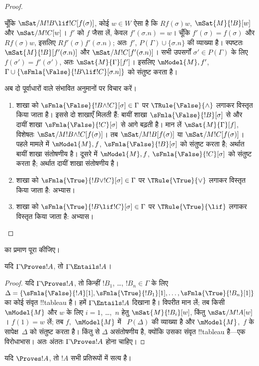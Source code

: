 \documentclass[../../../include/open-logic-section]{subfiles}
\begin{document}
\begin{proof}
\begin{enumerate}
  चूँकि $\mSat/{M}{!B \lif !C}[f(\sigma)]$, कोई $w \in W$ ऐसा है कि
  $Rf(\sigma)w$, $\mSat{M}{!B}[w]$ और $\mSat/{M}{!C}[w]$। $f'$ को $f$
  जैसा लें, केवल $f'(\sigma.n) = w$। चूँकि $f'(\sigma) = f(\sigma)$ और
  $Rf(\sigma)w$, इसलिए $Rf'(\sigma)f'(\sigma.n)$; अतः $f'$,
  $P(\Gamma) \cup \{\sigma.n\}$ की व्याख्या है। स्पष्टतः
  $\mSat{M}{!B}[f'(\sigma.n)]$ और $\mSat/{M}{!C}[f'(\sigma.n)]$। सभी
  उपसर्गों $\sigma' \in P(\Gamma)$ के लिए
  $f(\sigma') = f'(\sigma')$, अतः $\mSat{M}{\Gamma}[f']$। इसलिए
  $\mModel{M}, f'$,
  $\Gamma \cup \{\sFmla{\False}{!B \lif !C}[\sigma.n]\}$ को संतुष्ट करता
  है।
\end{enumerate}
अब दो पूर्वाधारों वाले संभावित अनुमानों पर विचार करें।
\begin{enumerate}
\item शाखा को $\sFmla{\False}{!B \land !C}[\sigma] \in \Gamma$ पर
  $\TRule{\False}{\land}$ लगाकर विस्तृत किया जाता है। इससे दो शाखाएँ मिलती
  हैं: बायीं शाखा $\sFmla{\False}{!B}[\sigma]$ से और दायीं शाखा
  $\sFmla{\False}{!C}[\sigma]$ से आगे बढ़ती है। मान लें
  $\mSat{M}{\Gamma}[f]$, विशेषतः
  $\mSat/{M}{!B \land !C}[f(\sigma)]$। तब
  $\mSat/{M}{!B}[f(\sigma)]$ या $\mSat/{M}{!C}[f(\sigma)]$। पहले मामले
  में $\mModel{M}, f$, $\sFmla{\False}{!B}[\sigma]$ को संतुष्ट करता है;
  अर्थात बायीं शाखा संतोषणीय है। दूसरे में $\mModel{M}, f$,
  $\sFmla{\False}{!C}[\sigma]$ को संतुष्ट करता है; अर्थात दायीं शाखा
  संतोषणीय है।
\item शाखा को $\sFmla{\True}{!B \lor !C}[\sigma] \in \Gamma$ पर
    $\TRule{\True}{\lor}$ लगाकर विस्तृत किया जाता है: अभ्यास।
\item शाखा को $\sFmla{\True}{!B \lif !C}[\sigma] \in \Gamma$ पर
    $\TRule{\True}{\lif}$ लगाकर विस्तृत किया जाता है: अभ्यास।
\end{enumerate}
\end{proof}

\begin{prob}
 का प्रमाण पूरा कीजिए।
\end{prob}

\begin{cor}
यदि $\Gamma \Proves !A$, तो $\Gamma \Entails !A$।
\end{cor}

\begin{proof}
  यदि $\Gamma \Proves !A$, तो किन्हीं $!B_1$, \dots, $!B_n \in \Gamma$
  के लिए
  $\Delta = \{\sFmla{\False}{!A}[1], \sFmla{\True}{!B_1}[1],
  \dots, \sFmla{\True}{!B_n}[1]\}$ का कोई संवृत !!{tableau} है। हमें
  $\Gamma \Entails !A$ दिखाना है। विपरीत मान लें; तब किसी $\mModel{M}$
  और $w$ के लिए $i=1$, \dots,~$n$ हेतु $\mSat{M}{!B_i}[w]$, किंतु
  $\mSat/{M}{!A}[w]$। $f(1) = w$ लें; तब $f$,~$\mModel{M}$ में
  ~$P(\Delta)$ की व्याख्या है और $\mModel{M}$,~$f$ के सापेक्ष~$\Delta$ को
  संतुष्ट करता है। किंतु  से $\Delta$
  असंतोषणीय है, क्योंकि उसका संवृत !!{tableau} है---एक विरोधाभास। अतः अंततः
  $\Gamma \Proves !A$ होना चाहिए।
\end{proof}

\begin{cor}
यदि $\Proves !A$, तो $!A$ सभी प्रतिरूपों में सत्य है।
\end{cor}
\end{document}
